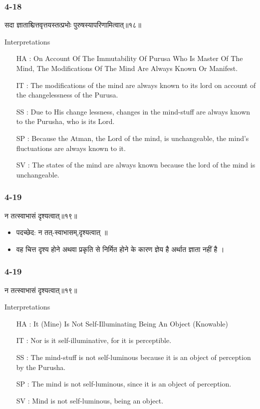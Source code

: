 \begin{frame}[fragile]\frametitle{4-18}
\begin{sanskrit}
सदा ज्ञाताश्चित्तवृत्तयस्तत्प्रभोः पुरुषस्यापरिणामित्वात्॥१८॥
\end{sanskrit}

Interpretations
\begin{itemize}	
\item [HA]: On Account Of The Immutability Of Purusa Who Is Master Of The Mind, The Modifications Of The Mind Are Always Known Or Manifest.
\item [IT]: The modifications of the mind are always known to its lord on account of the changelessness of the Purusa.
\item [SS]: Due to His change lessness, changes in the mind-stuff are always known to the Purusha, who is its Lord.
\item [SP]: Because the Atman, the Lord of the mind, is unchangeable, the mind’s fluctuations are always known to it.
\item [SV]: The states of the mind are always known because the lord of the mind is unchangeable.
\end{itemize}
\end{frame}

\begin{frame}[fragile]\frametitle{4-19}
\begin{sanskrit}
न तत्स्वाभासं दृश्यत्वात्॥१९॥
\end{sanskrit}

\begin{itemize}
\item पदच्छेद:  ‌न तत्-स्वाभासम्,दृश्यत्वात् ॥
\item  वह चित्त दृश्य होने अथवा प्रकृति से निर्मित होने के कारण ज्ञेय है अर्थात ज्ञाता नहीं है ।
\end{itemize}
\end{frame}

\begin{frame}[fragile]\frametitle{4-19}
\begin{sanskrit}
न तत्स्वाभासं दृश्यत्वात्॥१९॥
\end{sanskrit}

Interpretations
\begin{itemize}	
\item [HA]: It (Mine) Is Not Self-Illuminating Being An Object (Knowable)
\item [IT]: Nor is it self-illuminative, for it is perceptible.
\item [SS]: The mind-stuff is not self-luminous because it is an object of perception by the Purusha.
\item [SP]: The mind is not self-luminous, since it is an object of perception.
\item [SV]: Mind is not self-luminous, being an object. 
\end{itemize}
\end{frame}

